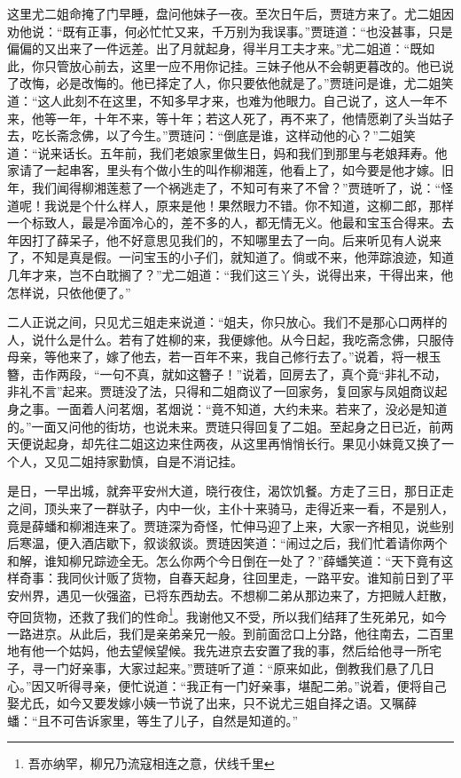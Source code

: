 \documentclass[12pt,oneside]{book}
\begin{document}
这里尤二姐命掩了门早睡，盘问他妹子一夜。至次日午后，贾琏方来了。尤二姐因劝他说：“既有正事，何必忙忙又来，千万别为我误事。”贾琏道：“也没甚事，只是偏偏的又出来了一件远差。出了月就起身，得半月工夫才来。”尤二姐道：“既如此，你只管放心前去，这里一应不用你记挂。三妹子他从不会朝更暮改的。他已说了改悔，必是改悔的。他已择定了人，你只要依他就是了。”贾琏问是谁，尤二姐笑道：“这人此刻不在这里，不知多早才来，也难为他眼力。自己说了，这人一年不来，他等一年，十年不来，等十年；若这人死了，再不来了，他情愿剃了头当姑子去，吃长斋念佛，以了今生。”贾琏问：“倒底是谁，这样动他的心？”二姐笑道：“说来话长。五年前，我们老娘家里做生日，妈和我们到那里与老娘拜寿。他家请了一起串客，里头有个做小生的叫作柳湘莲，他看上了，如今要是他才嫁。旧年，我们闻得柳湘莲惹了一个祸逃走了，不知可有来了不曾？”贾琏听了，说：“怪道呢！我说是个什么样人，原来是他！果然眼力不错。你不知道，这柳二郎，那样一个标致人，最是冷面冷心的，差不多的人，都无情无义。他最和宝玉合得来。去年因打了薛呆子，他不好意思见我们的，不知哪里去了一向。后来听见有人说来了，不知是真是假。一问宝玉的小子们，就知道了。倘或不来，他萍踪浪迹，知道几年才来，岂不白耽搁了？”尤二姐道：“我们这三丫头，说得出来，干得出来，他怎样说，只依他便了。”

二人正说之间，只见尤三姐走来说道：“姐夫，你只放心。我们不是那心口两样的人，说什么是什么。若有了姓柳的来，我便嫁他。从今日起，我吃斋念佛，只服侍母亲，等他来了，嫁了他去，若一百年不来，我自己修行去了。”说着，将一根玉簪，击作两段，“一句不真，就如这簪子！”说着，回房去了，真个竟“非礼不动，非礼不言”起来。贾琏没了法，只得和二姐商议了一回家务，复回家与凤姐商议起身之事。一面着人问茗烟，茗烟说：“竟不知道，大约未来。若来了，没必是知道的。”一面又问他的街坊，也说未来。贾琏只得回复了二姐。至起身之日已近，前两天便说起身，却先往二姐这边来住两夜，从这里再悄悄长行。果见小妹竟又换了一个人，又见二姐持家勤慎，自是不消记挂。

是日，一早出城，就奔平安州大道，晓行夜住，渴饮饥餐。方走了三日，那日正走之间，顶头来了一群驮子，内中一伙，主仆十来骑马，走得近来一看，不是别人，竟是薛蟠和柳湘连来了。贾琏深为奇怪，忙伸马迎了上来，大家一齐相见，说些别后寒温，便入酒店歇下，叙谈叙谈。贾琏因笑道：“闹过之后，我们忙着请你两个和解，谁知柳兄踪迹全无。怎么你两个今日倒在一处了？”薛蟠笑道：“天下竟有这样奇事：我同伙计贩了货物，自春天起身，往回里走，一路平安。谁知前日到了平安州界，遇见一伙强盗，已将东西劫去。不想柳二弟从那边来了，方把贼人赶散，夺回货物，还救了我们的性命\footnote{吾亦纳罕，柳兄乃流寇相连之意，伏线千里}。我谢他又不受，所以我们结拜了生死弟兄，如今一路进京。从此后，我们是亲弟亲兄一般。到前面岔口上分路，他往南去，二百里地有他一个姑妈，他去望候望候。我先进京去安置了我的事，然后给他寻一所宅子，寻一门好亲事，大家过起来。”贾琏听了道：“原来如此，倒教我们悬了几日心。”因又听得寻亲，便忙说道：“我正有一门好亲事，堪配二弟。”说着，便将自己娶尤氏，如今又要发嫁小姨一节说了出来，只不说尤三姐自择之语。又嘱薛蟠：“且不可告诉家里，等生了儿子，自然是知道的。”
\end{document}
